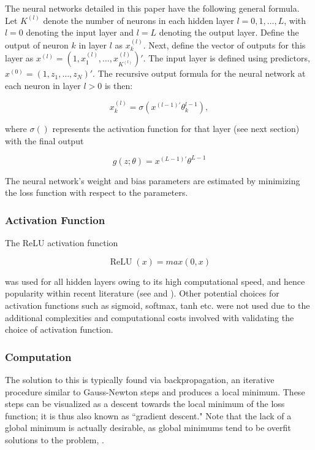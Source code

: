 \documentclass[a4paper]{article}
\begin{document}
	The neural networks detailed in this paper have the following general formula. Let $K^{(l)}$ denote the number of neurons in each hidden layer $l = 0, 1, \dots, L$, with $l = 0$ denoting the input layer and $l = L$ denoting the output layer. Define the output of neuron $k$ in layer $l$ as $x_k^{(l)}$. Next, define the vector of outputs for this layer as $x^{(l)} = (1, x_1^{(l)}, \dots, x_{K^(l)}^{(l)})'$. The input layer is defined using predictors, $x^{(0)} = (1, z_1, \dots, z_N)'$. The recursive output formula for the neural network at each neuron in layer $l > 0$ is then:
	
	\begin{equation}
	x_k^{(l)} = \sigma(x^{(l-1)'}\theta_k^{l-1}),
	\end{equation}
	
	where $\sigma()$ represents the activation function for that layer (see next section) with the final output
	
	\begin{equation}
	g(z;\theta) = x^{(L-1)'}\theta^{L-1}
	\end{equation}
	
	The neural network's weight and bias parameters are estimated by minimizing the loss function with respect to the parameters.
	
	\subsubsection{Activation Function}
	
	The ReLU activation function
	
	\begin{equation}
	\operatorname{ReLU}(x) = max(0, x)
	\end{equation}
	
	was used for all hidden layers owing to its high computational speed, and hence popularity within recent literature  (see \cite{lecun_deep_2015} and \cite{ramachandran_searching_2017}). Other potential choices for activation functions such as sigmoid, softmax, tanh etc. were not used due to the additional complexities and computational costs involved with validating the choice of activation function.
	
	\subsubsection{Computation}
	
	The solution to this is typically found via backpropagation, an iterative procedure similar to Gauss-Newton steps and produces a local minimum. These steps can be visualized as a descent towards the local minimum of the loss function; it is thus also known as ``gradient descent." Note that the lack of a global minimum is actually desirable, as global minimums tend to be overfit solutions to the problem, \citep{choromanska_loss_2014}.
	
\end{document}
